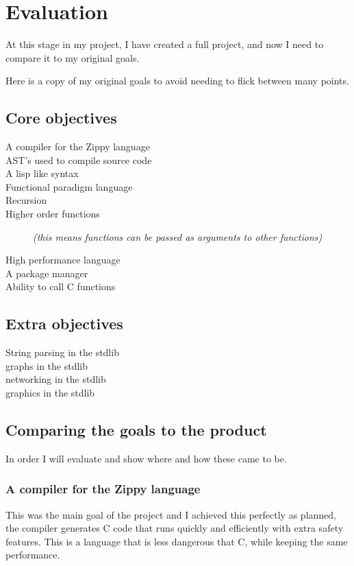 \documentclass[a4paper,12pt]{article}
\begin{document}
{\section{Evaluation}
At this stage in my project, I have created a full project, and now I need to compare it to my original goals. 

Here is a copy of my original goals to avoid needing to flick between many points.
\subsection{Core objectives}
\begin{description}
	\item[A compiler for the Zippy language]
	\item[AST's used to compile source code]
	\item[A lisp like syntax]
	\item[Functional paradigm language]
	\item[Recursion]
	\item[Higher order functions] \textit{(this means functions can be passed as arguments to 
		other functions)}
	\item[High performance language]
	\item[A package manager]
	\item[Ability to call C functions]
\end{description}
\subsection{Extra objectives}
\begin{description}
	\item[String parsing in the stdlib]
	\item[graphs in the stdlib]
	\item[networking in the stdlib]
	\item[graphics in the stdlib]
\end{description}

\subsection{Comparing the goals to the product}
In order I will evaluate and show where and how these came to be.

\subsubsection{A compiler for the Zippy language}
This was the main goal of the project and I achieved this perfectly as planned, the compiler generates C code that runs
quickly and efficiently with extra safety features. This is a language that is less dangerous that C, while keeping the 
same performance.

}
\end{document}

